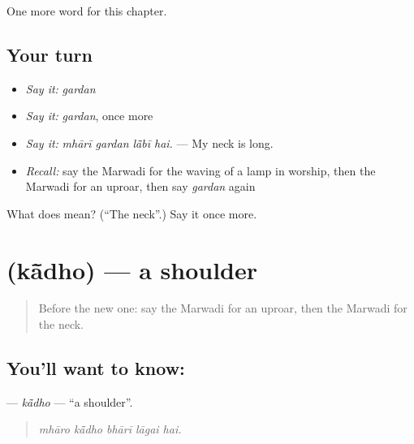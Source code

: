 \begin{grammarlens}[title={What you've built}]
One more word for this chapter.
\end{grammarlens}

\subsection*{Your turn}
\begin{itemize}
\raggedright
  \item \emph{Say it:} \emph{gardan}
  \item \emph{Say it:} \emph{gardan}, once more
  \item \emph{Say it:} \emph{mhārī gardan lā̃bī hai.} — My neck is long.
  \item \emph{Recall:} say the Marwadi for the waving of a lamp in worship, then the Marwadi for an uproar, then say \emph{gardan} again
\end{itemize}

\begin{tcolorbox}[breakable,colback=teal!4,colframe=teal!35!black,title={Before you move on}]
What does  mean? (\textquotedblleft{}The neck\textquotedblright{}.) Say it once more.
\end{tcolorbox}
\section[\texorpdfstring{\mw{कांधो} (kā̃dho)}{कांधो (kā̃dho)}]{ (kā̃dho) — a shoulder}

\label{lesson:MW-C251-kadho}



\begin{quote}
Before the new one: say the Marwadi for an uproar, then the Marwadi for the neck.
\end{quote}

\subsection*{You'll want to know: }
\textbf{} — \emph{kā̃dho} — \textquotedblleft{}a shoulder\textquotedblright{}.

\begin{quote}
    
\end{quote}

\begin{quote}
\emph{mhāro kā̃dho bhārī lāgai hai.}
\end{quote}

